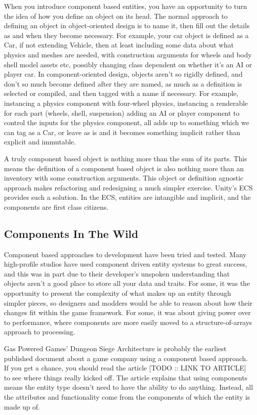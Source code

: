 \documentclass[a4paper,12pt]{article}
\begin{document}
When you introduce component based entities, you have an opportunity to turn the idea of how you define an object on its head.
The normal approach to defining an object in object-oriented design is to name it, then fill out the details as and when they become necessary.
For example, your car object is defined as a Car, if not extending Vehicle, then at least including some data about what physics and meshes are needed, with construction arguments for wheels and body shell model assets etc, possibly changing class dependent on whether it's an AI or player car.
In component-oriented design, objects aren't so rigidly defined, and don't so much become defined after they are named, as much as a definition is selected or compiled, and then tagged with a name if necessary.
For example, instancing a physics component with four-wheel physics, instancing a renderable for each part (wheels, shell, suspension) adding an AI or player component to control the inputs for the physics component, all adds up to something which we can tag as a Car, or leave as is and it becomes something implicit rather than explicit and immutable.

A truly component based object is nothing more than the sum of its parts.
This means the definition of a component based object is also nothing more than an inventory with some construction arguments.
This object or definition agnostic approach makes refactoring and redesigning a much simpler exercise.
Unity's ECS provides such a solution.
In the ECS, entities are intangible and implicit, and the components are first class citizens.

\subsection{Components In The Wild}

Component based approaches to development have been tried and tested.
Many high-profile studios have used component driven entity systems to great success, and this was in part due to their developer's unspoken understanding that objects aren't a good place to store all your data and traits.
For some, it was the opportunity to present the complexity of what makes up an entity through simpler pieces, so designers and modders would be able to reason about how their changes fit within the game framework.
For some, it was about giving power over to performance, where components are more easily moved to a structure-of-arrays approach to processing.

Gas Powered Games' Dungeon Siege Architecture is probably the earliest published document about a game company using a component based approach.
If you get a chance, you should read the article [TODO :: LINK TO ARTICLE] to see where things really kicked off.
The article explains that using components means the entity type doesn't need to have the ability to do anything.
Instead, all the attributes and functionality come from the components of which the entity is made up of.
\end{document}

